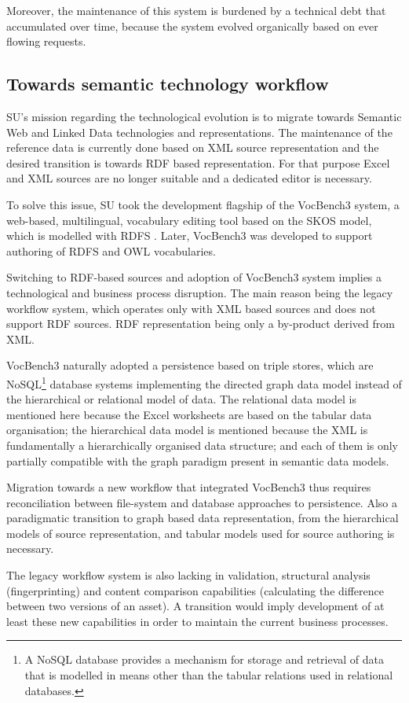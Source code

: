 	Moreover,  the maintenance of this system is burdened by a technical debt that accumulated over time, because the system evolved organically based on ever flowing requests. 
	

	\subsection{Towards semantic technology workflow}
	
	SU's mission regarding the technological evolution is to migrate towards Semantic Web and Linked Data technologies and representations. The maintenance of the reference data is currently done based on XML source representation and the desired transition is towards RDF based representation. For that purpose Excel and XML sources are no longer suitable and a dedicated editor is necessary.
	
	To solve this issue, SU took the development flagship of the VocBench3 \citep{stellatovocbench} system, a web-based, multilingual, vocabulary editing tool based on the SKOS \citep{skos-spec} model, which is modelled with RDFS \citep{rdfs1-spec,rdfs11-spec}. Later, VocBench3 was developed to support authoring of RDFS and OWL vocabularies.
	
	Switching to RDF-based sources and adoption of VocBench3 system implies a technological and business process disruption. The main reason being the legacy workflow system, which operates only with XML based sources and does not support RDF sources. RDF representation being only a by-product derived from XML. 
	
	VocBench3 naturally adopted a persistence based on triple stores, which are NoSQL\footnote{A NoSQL database provides a mechanism for storage and retrieval of data that is modelled in means other than the tabular relations used in relational databases.} database systems implementing the directed graph data model instead of the hierarchical or relational model of data. The relational data model is mentioned here because the Excel worksheets are based on the tabular data organisation; the hierarchical data model is mentioned because the XML is fundamentally a hierarchically organised data structure; and each of them is only partially compatible with the graph paradigm present in semantic data models. 
	
	Migration towards a new workflow that integrated VocBench3 thus requires reconciliation between file-system and database approaches to persistence. Also a paradigmatic transition to graph based data representation, from the hierarchical models of source representation, and tabular models used for source authoring is necessary.
	 
	The legacy workflow system is also lacking in validation, structural analysis (fingerprinting) and content comparison capabilities (calculating the difference between two versions of an asset). A transition would imply development of at least these new capabilities in order to maintain the current business processes. 
	
